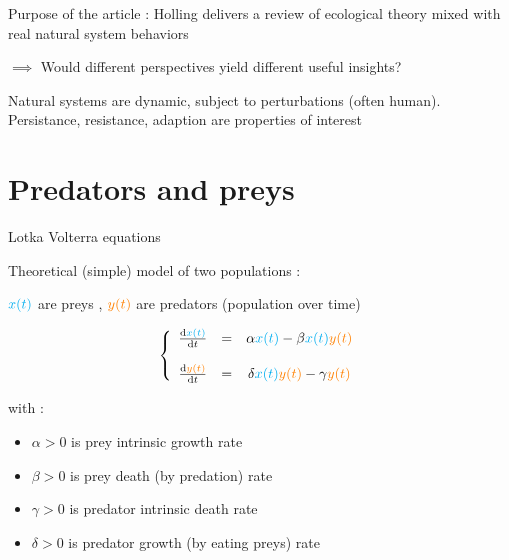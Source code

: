 \documentclass[11,aspectratio=1610]{beamer}
\begin{document}
  

\begin{frame}{Purpose of the article  : }
Holling delivers \alert{a review of ecological theory} mixed with  {real natural system behaviors} \\ 

\vfill

$\implies$ Would different perspectives yield different useful insights?  

\vfill
Natural systems are \alert{dynamic}, subject to \alert{perturbations} (often human). \\

\vfill
\alert{Persistance, resistance, adaption} are properties of interest






\end{frame}
  

\section{Predators and preys}


\begin{frame}{Lotka Volterra equations}


Theoretical (simple) model of two populations : 

$\color{cyan}{x(t)}$ are preys , $\color{orange}{y(t)}$ are predators  (population over time)


\[
\left\{
 \begin{array}{ccc}  
 \frac{\mathrm{d}\textcolor{cyan}{x(t)}}{\mathrm{d}t}&=&  \alpha \textcolor{cyan}{x(t)} - \beta \textcolor{cyan}{x(t)}\textcolor{orange}{y(t)}\\
 \\
\frac{\mathrm{d}\textcolor{orange}{y(t)}}{\mathrm{d}t}&=&  \delta \textcolor{cyan}{x(t)}\textcolor{orange}{y(t)} - \gamma \textcolor{orange}{y(t)}  \end{array}
\right.
\]


with : 
\begin{footnotesize}
\begin{itemize}
  \item  $\alpha >0$ is prey intrinsic growth rate
  \item  $\beta >0 $ is  prey death  (by predation) rate
  \item  $\gamma >0 $ is predator intrinsic death rate
  \item  $\delta > 0$  is predator growth (by eating preys) rate
\end{itemize}
\end{footnotesize}
\end{frame}
\end{document}
